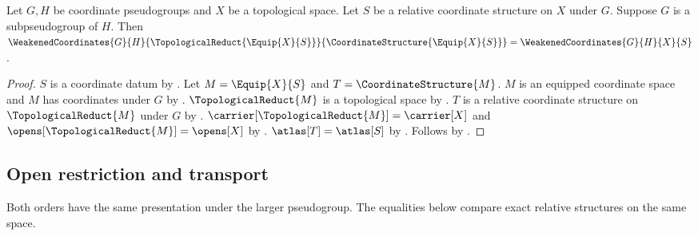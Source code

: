 \begin{theorem}\label{weakened_coordinates_of_equip}
    Let $G,H$ be coordinate pseudogroups and $X$ be a topological space.
    Let $S$ be a relative coordinate structure on $X$ under $G$.
    Suppose $G$ is a subpseudogroup of $H$.
    Then $\WeakenedCoordinates{G}{H}{\TopologicalReduct{\Equip{X}{S}}}{\CoordinateStructure{\Equip{X}{S}}}
        =\WeakenedCoordinates{G}{H}{X}{S}$.
\end{theorem}
\begin{proof}
    $S$ is a coordinate datum by .
    Let $M=\Equip{X}{S}$ and $T=\CoordinateStructure{M}$.
    $M$ is an equipped coordinate space and $M$ has coordinates under $G$ by
        .
    $\TopologicalReduct{M}$ is a topological space by .
    $T$ is a relative coordinate structure on $\TopologicalReduct{M}$ under $G$ by
        .
    $\carrier[\TopologicalReduct{M}]=\carrier[X]$ and
        $\opens[\TopologicalReduct{M}]=\opens[X]$ by
        .
    $\atlas[T]=\atlas[S]$ by .
    Follows by .
\end{proof}

\subsection{Open restriction and transport}

Both orders have the same presentation under the larger pseudogroup.
The equalities below compare exact relative structures on the same space.

